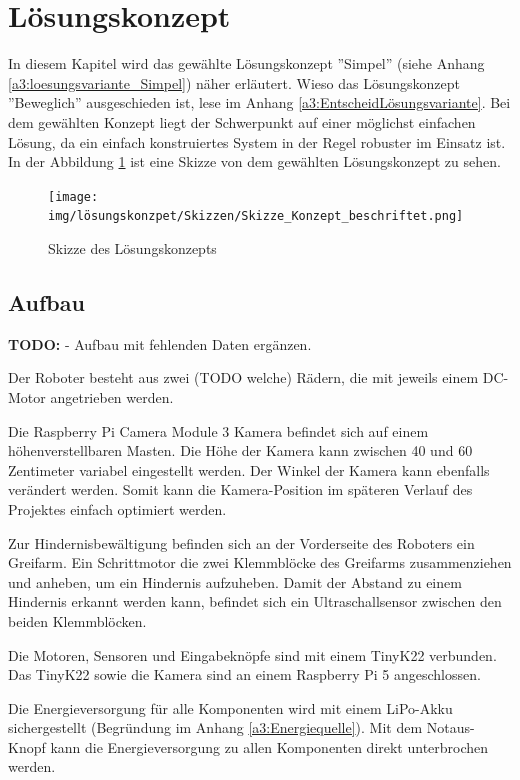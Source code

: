 \documentclass[../main.tex]{subfiles}
\begin{document}
\newpage
\section{Lösungskonzept}

In diesem Kapitel wird das gewählte Lösungskonzept ''Simpel'' (siehe Anhang \ref{a3:loesungsvariante_Simpel}) näher erläutert. Wieso das Lösungskonzept ''Beweglich'' ausgeschieden ist, lese im Anhang \ref{a3:EntscheidLösungsvariante}. Bei dem gewählten Konzept liegt der Schwerpunkt auf einer möglichst einfachen Lösung, da ein einfach konstruiertes System in der Regel robuster im Einsatz ist. In der Abbildung \ref{img:Konzept-Skizze_Fahrzeug} ist eine Skizze von dem gewählten Lösungskonzept zu sehen.

\begin{figure}[H]
\centering
\texttt{[image: img/lösungskonzpet/Skizzen/Skizze\_Konzept\_beschriftet.png]}
\caption{Skizze des Lösungskonzepts}
\label{img:Konzept-Skizze_Fahrzeug}
\end{figure}

\subsection{Aufbau}

\textbf{TODO:} 
- Aufbau mit fehlenden Daten ergänzen.  


Der Roboter besteht aus zwei (TODO welche) Rädern, die mit jeweils einem DC-Motor angetrieben werden.

Die Raspberry Pi Camera Module 3 Kamera befindet sich auf einem höhenverstellbaren Masten. Die Höhe der Kamera kann zwischen 40 und 60 Zentimeter variabel eingestellt werden. Der Winkel der Kamera kann ebenfalls verändert werden. Somit kann die Kamera-Position im späteren Verlauf des Projektes einfach optimiert werden.

Zur Hindernisbewältigung befinden sich an der Vorderseite des Roboters ein Greifarm. Ein Schrittmotor die zwei Klemmblöcke des Greifarms zusammenziehen und anheben, um ein Hindernis aufzuheben. Damit der Abstand zu einem Hindernis erkannt werden kann, befindet sich ein Ultraschallsensor zwischen den beiden Klemmblöcken. 

Die Motoren, Sensoren und Eingabeknöpfe sind mit einem TinyK22 verbunden.
Das TinyK22 sowie die Kamera sind an einem Raspberry Pi 5 angeschlossen.

Die Energieversorgung für alle Komponenten wird mit einem LiPo-Akku sichergestellt (Begründung im Anhang \ref{a3:Energiequelle}).
Mit dem Notaus-Knopf kann die Energieversorgung zu allen Komponenten direkt unterbrochen werden.
\end{document}
